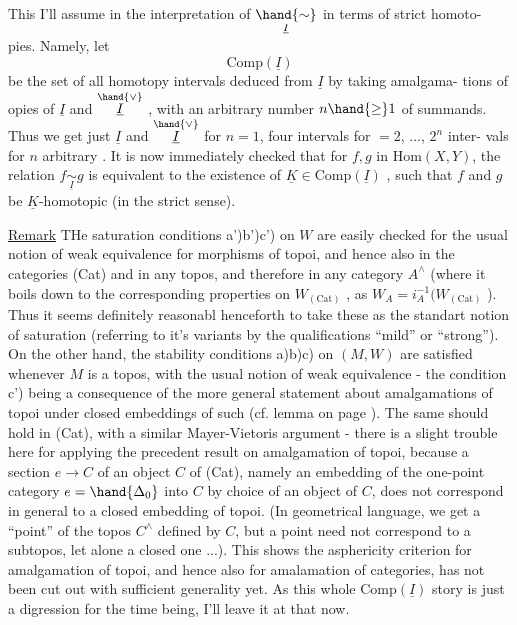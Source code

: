 This I'll assume in the interpretation of $\underset{\underline{I}}{\hand{\sim}}$ in terms of strict homoto-%
pies. Namely, let
\[ \mathrm{Comp}(\underline{I}) \]
be the set of all homotopy intervals deduced from $\underline{I}$ by taking amalgama-%
tions of opies of $\underline{I}$ and $\overset{\hand{\vee}}{\underline{I}}$ , with an arbitrary number $n \hand{\geq} 1$ of summands.
Thus we get just $\underline{I}$ and $\overset{\hand{\vee}}{\underline{I}}$ for $n=1$, four intervals for $=2$, ..., $2^n$ inter-%
vals for $n$ arbitrary . It is now immediately checked that for $f,g$ in
$\mathrm{Hom}(X,Y)$,  the relation $f \underset{\underline{I}}{\sim} g$ is equivalent to the existence of
$\underline{K} \in \mathrm{Comp}(\underline{I})$ , such that $f$ and $g$ be $\underline{K}$-homotopic (in the strict sense).

\uline{Remark} THe saturation conditions a')b')c') on  $W$ are easily checked
for the usual notion of weak equivalence for morphisms of topoi, and hence
also in the categories  (Cat) and in any topos, and therefore
in any category $A^{\wedge}$\hand{$\hat{}$} (where it boils down  to the corresponding properties
on $W_{(\mathrm{Cat})}$ , as $W_A = i_A^{-1}(W_{(\mathrm{Cat})}$ ). Thus it seems definitely reasonabl
henceforth to take these as the standart notion of saturation (referring 
to it's variants by the qualifications ``mild'' or ``strong''). On the other
hand, the stability conditions a)b)c) on $(M,W)$ are satisfied whenever $M$
is a topos, with the usual notion of weak equivalence - the condition
c') being a consequence of the more general  statement about amalgamations
of topoi under closed embeddings of such (cf. lemma on page ). The
same should hold in (Cat), with a similar Mayer-Vietoris argument -
there is a slight trouble here for applying the precedent result on
amalgamation of topoi, because a section $e \to C$ of an object $C$
of (Cat), namely an embedding of the one-point category $e=\hand{\Delta_0}$ into $C$ by
choice of an object of $C$, does not correspond in general to a closed
embedding of topoi. (In geometrical language, we get a ``point'' of the
topos $C^{\wedge}$ defined by $C$, but a point need not correspond to a subtopos,
let alone a closed one ...). This shows the asphericity criterion for
amalgamation of topoi, and hence also for amalamation of categories,
has not been cut out with sufficient generality yet. As this whole
$\mathrm{Comp}(\underline{I})$ story is just a digression for the time being, I'll leave it at
that now.

